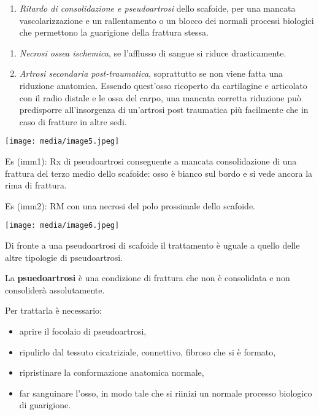 \documentclass[]{article}
\begin{document}
\begin{enumerate}
\def\labelenumi{\arabic{enumi}.}
\item
  \emph{Ritardo di consolidazione e pseudoartrosi} dello scafoide, per
  una mancata vascolarizzazione e un rallentamento o un blocco dei
  normali processi biologici che permettono la guarigione della frattura
  stessa.
\end{enumerate}

\begin{enumerate}
\def\labelenumi{\arabic{enumi}.}
\item
  \emph{Necrosi ossea ischemica}, se l'afflusso di sangue si riduce
  drasticamente.
\item
  \emph{Artrosi secondaria post-traumatica}, soprattutto se non viene
  fatta una riduzione anatomica. Essendo quest'osso ricoperto da
  cartilagine e articolato con il radio distale e le ossa del carpo, una
  mancata corretta riduzione può predisporre all'insorgenza di
  un'artrosi post traumatica più facilmente che in caso di fratture in
  altre sedi.
\end{enumerate}

\texttt{[image: media/image5.jpeg]}

Es (imm1): Rx di pseudoartrosi conseguente a mancata consolidazione di
una frattura del terzo medio dello scafoide: osso è bianco sul bordo e
si vede ancora la rima di frattura.

Es (imm2): RM con una necrosi del polo prossimale dello scafoide.

\texttt{[image: media/image6.jpeg]}

Di fronte a una pseudoartrosi di scafoide il trattamento è uguale a
quello delle altre tipologie di pseudoartrosi.

La \textbf{psuedoartrosi} è una condizione di frattura che non è
consolidata e non consoliderà assolutamente.

Per trattarla è necessario:

\begin{itemize}
\item
  aprire il focolaio di pseudoartrosi,
\item
  ripulirlo dal tessuto cicatriziale, connettivo, fibroso che si è
  formato,
\item
  ripristinare la conformazione anatomica normale,
\item
  far sanguinare l'osso, in modo tale che si riinizi un normale processo
  biologico di guarigione.
\end{itemize}
\end{document}
